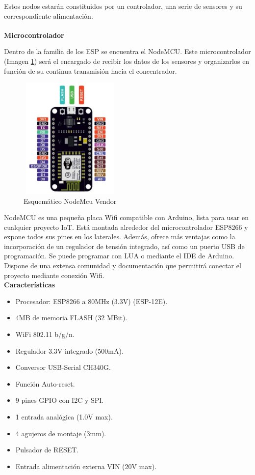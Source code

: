     Estos nodos estarán constituidos por un controlador, una serie de sensores y su correspondiente alimentación.\\\\

    \textbf{Microcontrolador}

    Dentro de la familia de los ESP se encuentra el NodeMCU. Este microcontrolador (Imagen \ref{imag:nodemcu}) será el encargado de recibir los datos de los sensores y organizarlos en función de su continua transmisión hacia el concentrador.\\

    \begin{figure}[h]
        \centering
        \includegraphics[width=5cm, height=6cm]{imagenes/nodemcu0.jpg}
        \caption{Esquemático NodeMcu Vendor}
        \label{imag:nodemcu}
    \end{figure}
    
    
    NodeMCU es una pequeña placa Wifi compatible con Arduino, lista para usar en cualquier proyecto IoT. Está montada alrededor del microcontrolador ESP8266 y expone todos sus pines en los laterales. Además, ofrece más ventajas como la incorporación de un regulador de tensión integrado, así como un puerto USB de programación. Se puede programar con LUA o mediante el IDE de Arduino.\\

    Dispone de una extensa comunidad y documentación que permitirá conectar el proyecto mediante conexión Wifi.\\

    \textbf{Características}
    \begin{itemize}
        \item Procesador: ESP8266 a 80MHz (3.3V) (ESP-12E).
        \item 4MB de memoria FLASH (32 MBit).
        \item WiFi 802.11 b/g/n.
        \item Regulador 3.3V integrado (500mA).
        \item Conversor USB-Serial CH340G.
        \item Función Auto-reset.
        \item 9 pines GPIO con I2C y SPI.
        \item 1 entrada analógica (1.0V max).
        \item 4 agujeros de montaje (3mm).
        \item Pulsador de RESET.
        \item Entrada alimentación externa VIN (20V max).\\
    \end{itemize}

